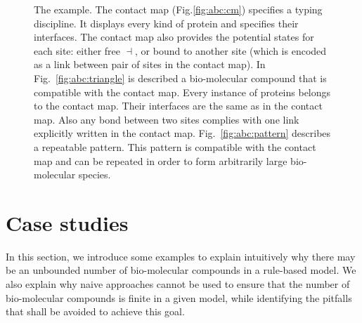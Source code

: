 \documentclass{entcs}
\newcommand{\freesymbol}{\dashv}
\begin{document}
\begin{figure}
\caption{The  example.
The contact map  (Fig.\ref{fig:abc:cm}) specifies a typing discipline.
It displays every kind of protein and specifies their interfaces.
The contact map also provides the potential states for each site:
either free $\freesymbol$, or bound to another site (which is encoded as a link between pair of sites in the contact map).
In Fig.~\ref{fig:abc:triangle} is described a bio-molecular compound that is compatible with the contact map. Every instance of proteins belongs to the contact map. Their interfaces are the same as in the contact map.
Also any bond between two sites complies with one link explicitly written in the contact map.
Fig.~\ref{fig:abc:pattern} describes a repeatable pattern.
This pattern is compatible with the contact map and can be repeated in order to form arbitrarily large bio-molecular species.
}
\end{figure}
\section{Case studies}
\label{sec:case-study}

In this section, we introduce some examples to explain intuitively why there may be an unbounded number of bio-molecular compounds in a rule-based model.  We also explain why naive approaches cannot be used to ensure that the number of bio-molecular compounds is finite in a given model,  while identifying the pitfalls that shall be avoided to achieve this goal.
\end{document}
